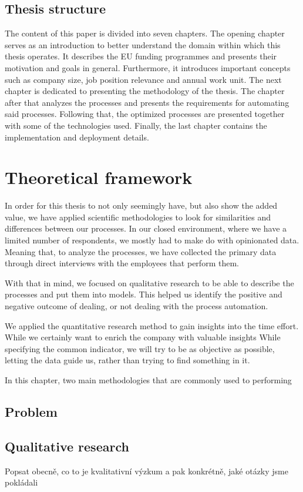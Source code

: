 \documentclass[12pt,oneside]{fithesis2}
\begin{document}
\section{Thesis structure}
The content of this paper is divided into seven chapters. The opening chapter serves as an introduction to better understand the domain within which this thesis operates. It describes the EU funding programmes and presents their motivation and goals in general. Furthermore, it introduces important concepts such as company size, job position relevance and annual work unit. The next chapter is dedicated to presenting the methodology of the thesis. The chapter after that analyzes the processes and presents the requirements for automating said processes. Following that, the optimized processes are presented together with some of the technologies used. Finally, the last chapter contains the implementation and deployment details.

\chapter{Theoretical framework}
In order for this thesis to not only seemingly have, but also show the added value, we have applied scientific methodologies to look for similarities and differences between our processes. In our closed environment, where we have a limited number of respondents, we mostly had to make do with opinionated data. Meaning that, to analyze the processes, we have collected the primary data through direct interviews with the employees that perform them.

With that in mind, we focused on qualitative research to be able to describe the processes and put them into models. This helped us identify the positive and negative outcome of dealing, or not dealing with the process automation. 

We applied the quantitative research method to gain insights into the time effort. While we certainly want to enrich the company with valuable insights 
While specifying the common indicator, we will try to be as objective as possible, letting the data guide us, rather than trying to find something in it.

In this chapter, two main methodologies that are commonly used to performing
\section{Problem}
\section{Qualitative research}
Popsat obecně, co to je kvalitativní výzkum a pak konkrétně, jaké otázky jsme pokládali
\end{document}
